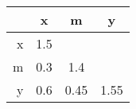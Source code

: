 \begin{table}[ht]
\centering
\begin{tabular}{r|ccc}
  \hline
 & x & m & y \\ 
  \hline
x & 1.5 &  &  \\ 
  m & 0.3 & 1.4 &  \\ 
  y & 0.6 & 0.45 & 1.55 \\ 
   \hline
\end{tabular}
\end{table}